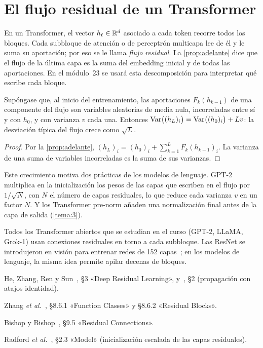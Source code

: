 \section{El flujo residual de un Transformer}

En un Transformer, el vector $h_\ell\in\mathbb{R}^{d}$ asociado a cada token recorre todos los bloques. Cada subbloque de atención o de perceptrón multicapa lee de él y le suma su aportación; por eso se le llama \emph{flujo residual}. La \cref{prop:adelante} dice que el flujo de la última capa es la suma del embedding inicial y de todas las aportaciones. En el módulo~23 se usará esta descomposición para interpretar qué escribe cada bloque.

\begin{proposicion}\label{prop:crecimiento}
Supóngase que, al inicio del entrenamiento, las aportaciones $F_k(h_{k-1})$ de una componente del flujo son variables aleatorias de media nula, incorreladas entre sí y con $h_0$, y con varianza $v$ cada una. Entonces $\operatorname{Var}\bigl((h_L)_i\bigr)=\operatorname{Var}\bigl((h_0)_i\bigr)+Lv$: la desviación típica del flujo crece como $\sqrt{L}$.
\end{proposicion}

\begin{proof}
Por la \cref{prop:adelante}, $(h_L)_i=(h_0)_i+\sum_{k=1}^{L}F_k(h_{k-1})_i$. La varianza de una suma de variables incorreladas es la suma de sus varianzas.
\end{proof}

Este crecimiento motiva dos prácticas de los modelos de lenguaje. GPT-2~\cite[§2.3]{gpt2} multiplica en la inicialización los pesos de las capas que escriben en el flujo por $1/\sqrt{N}$, con $N$ el número de capas residuales, lo que reduce cada varianza $v$ en un factor $N$. Y los Transformer pre-norm añaden una normalización final antes de la capa de salida (\cref{tema:3}).

\begin{observacion}
Todos los Transformer abiertos que se estudian en el curso (GPT-2, LLaMA, Grok-1) usan conexiones residuales en torno a cada subbloque. Las ResNet se introdujeron en visión para entrenar redes de 152 capas~\cite{resnet}; en los modelos de lenguaje, la misma idea permite apilar decenas de bloques.
\end{observacion}

\begin{lecturas}
\item He, Zhang, Ren y Sun~\cite{resnet}, §3 «Deep Residual Learning», y~\cite{resnet-id}, §2 (propagación con atajos identidad).
\item Zhang \emph{et al.}~\cite{d2l}, §8.6.1 «Function Classes» y §8.6.2 «Residual Blocks».
\item Bishop y Bishop~\cite{bishopdl}, §9.5 «Residual Connections».
\item Radford \emph{et al.}~\cite{gpt2}, §2.3 «Model» (inicialización escalada de las capas residuales).
\end{lecturas}

